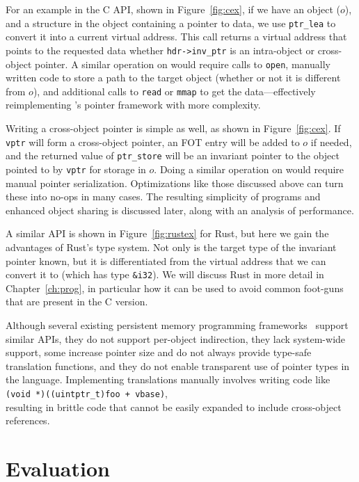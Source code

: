 For an example in the C API, shown in Figure~\ref{fig:cex}, if we have
an object ($o$), and a structure in
the object containing a pointer to data,
we use
\texttt{ptr\_lea} to convert it into a current virtual address.
This call returns a virtual address that points to the requested
data whether \texttt{hdr->inv\_ptr} is an intra-object or cross-object pointer.
A similar operation on \unix would require calls to \texttt{open}, manually
written code to store a path to the target object (whether or not it is
different from $o$), and additional calls to \texttt{read} or \texttt{mmap} to
get the data---effectively reimplementing \Twizzler's pointer
framework with more complexity.

Writing a cross-object pointer is simple as well, as shown in Figure~\ref{fig:cex}.
If \texttt{vptr} will form a cross-object pointer, an FOT entry will be added to $o$ if
needed, and the returned value of \texttt{ptr\_store} will be an invariant
pointer to the object pointed to by \texttt{vptr} for storage in $o$. Doing a
similar operation on \unix would require manual pointer serialization.
Optimizations like those discussed above can
turn these into no-ops in many cases. The resulting simplicity of programs and
enhanced object sharing is
discussed later, along with an analysis of performance.

A similar API is shown in Figure~\ref{fig:rustex} for Rust, but here we gain the advantages of Rust's type system. Not
only is the target type of the invariant pointer known, but it is differentiated from the virtual address that we can
convert it to (which has type \texttt{\&i32}). We will discuss Rust in more detail in Chapter~\ref{ch:prog}, in
particular how it can be used to avoid common foot-guns that are present in the C version.

Although several existing persistent memory programming
frameworks~\cite{libpmem,Chen:micro17,wang:micro17} support similar
APIs, they do not support per-object indirection, they lack system-wide support,
some increase pointer size and do not always provide
type-safe translation functions, and they do not enable transparent use of pointer
types in the language. Implementing translations manually involves writing code
like\\
\hspace*{10mm}\texttt{(void *)((uintptr\_t)foo + vbase)},\\ resulting in brittle code that
cannot be easily expanded to include cross-object references.


\section{Evaluation}

